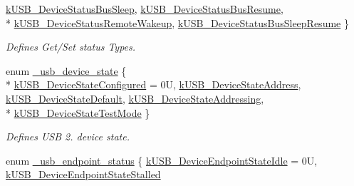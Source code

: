 \begin{DoxyCompactItemize}
\hyperlink{group__usb__device__driver_ggad091bd3169bf45debbe8b5aba78d6091a0ac5bacc26d67cf8f1401cf2804c8748}{k\-U\-S\-B\-\_\-\-Device\-Status\-Bus\-Sleep}, 
\hyperlink{group__usb__device__driver_ggad091bd3169bf45debbe8b5aba78d6091aca838250308618a1f4210410f81d136e}{k\-U\-S\-B\-\_\-\-Device\-Status\-Bus\-Resume}, 
\\*
\hyperlink{group__usb__device__driver_ggad091bd3169bf45debbe8b5aba78d6091a14f036d2f6ae26676a3da34d3d735ea0}{k\-U\-S\-B\-\_\-\-Device\-Status\-Remote\-Wakeup}, 
\hyperlink{group__usb__device__driver_ggad091bd3169bf45debbe8b5aba78d6091aaf9c05a346d33cb1f2fc4834026dd623}{k\-U\-S\-B\-\_\-\-Device\-Status\-Bus\-Sleep\-Resume}
 \}
\begin{DoxyCompactList}\small\item\em Defines Get/\-Set status Types. \end{DoxyCompactList}\item 
enum \hyperlink{group__usb__device__driver_ga6c3587990ca428244271f14efc909522}{\-\_\-usb\-\_\-device\-\_\-state} \{ \\*
\hyperlink{group__usb__device__driver_gga6c3587990ca428244271f14efc909522a3cc5b3134e34ce6fc3d9c1ee0217e741}{k\-U\-S\-B\-\_\-\-Device\-State\-Configured} = 0\-U, 
\hyperlink{group__usb__device__driver_gga6c3587990ca428244271f14efc909522ac0b38e07063e3b0f01a984671e7bc23b}{k\-U\-S\-B\-\_\-\-Device\-State\-Address}, 
\hyperlink{group__usb__device__driver_gga6c3587990ca428244271f14efc909522a25d25f366cf27a445b19a92fd7d20698}{k\-U\-S\-B\-\_\-\-Device\-State\-Default}, 
\hyperlink{group__usb__device__driver_gga6c3587990ca428244271f14efc909522a257337842d7b3299efbaa8e1218d6069}{k\-U\-S\-B\-\_\-\-Device\-State\-Addressing}, 
\\*
\hyperlink{group__usb__device__driver_gga6c3587990ca428244271f14efc909522ab7ff5567abb58aa097fd8af77df16a8c}{k\-U\-S\-B\-\_\-\-Device\-State\-Test\-Mode}
 \}
\begin{DoxyCompactList}\small\item\em Defines U\-S\-B 2. device state. \end{DoxyCompactList}\item 
enum \hyperlink{group__usb__device__driver_ga58f9c3f9e1aeb5f669a4cb58556ed53f}{\-\_\-usb\-\_\-endpoint\-\_\-status} \{ \hyperlink{group__usb__device__driver_gga58f9c3f9e1aeb5f669a4cb58556ed53fa9956ef1389d5dad712cda6cf209a4ed5}{k\-U\-S\-B\-\_\-\-Device\-Endpoint\-State\-Idle} = 0\-U, 
\hyperlink{group__usb__device__driver_gga58f9c3f9e1aeb5f669a4cb58556ed53faad3658477257e2f76ac54a960763043b}{k\-U\-S\-B\-\_\-\-Device\-Endpoint\-State\-Stalled}

\end{DoxyCompactItemize}
